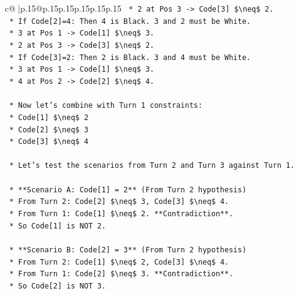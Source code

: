 \documentclass{article}
\begin{document}
{\begin{supertabular}{c@{$\;$}|p{.15\linewidth}@{}p{.15\linewidth}p{.15\linewidth}p{.15\linewidth}p{.15\linewidth}p{.15\linewidth}}
{{{\texttt{            *   2 at Pos 3 {-}> Code{[}3{]} \$\textbackslash{}neq\$ 2.} \\
\texttt{        *   If Code{[}2{]}=4: Then 4 is Black. 3 and 2 must be White.} \\
\texttt{            *   3 at Pos 1 {-}> Code{[}1{]} \$\textbackslash{}neq\$ 3.} \\
\texttt{            *   2 at Pos 3 {-}> Code{[}3{]} \$\textbackslash{}neq\$ 2.} \\
\texttt{        *   If Code{[}3{]}=2: Then 2 is Black. 3 and 4 must be White.} \\
\texttt{            *   3 at Pos 1 {-}> Code{[}1{]} \$\textbackslash{}neq\$ 3.} \\
\texttt{            *   4 at Pos 2 {-}> Code{[}2{]} \$\textbackslash{}neq\$ 4.} \\
\\ 
\texttt{    *   Now let's combine with Turn 1 constraints:} \\
\texttt{        *   Code{[}1{]} \$\textbackslash{}neq\$ 2} \\
\texttt{        *   Code{[}2{]} \$\textbackslash{}neq\$ 3} \\
\texttt{        *   Code{[}3{]} \$\textbackslash{}neq\$ 4} \\
\\ 
\texttt{    *   Let's test the scenarios from Turn 2 and Turn 3 against Turn 1.} \\
\\ 
\texttt{    *   **Scenario A: Code{[}1{]} = 2** (From Turn 2 hypothesis)} \\
\texttt{        *   From Turn 2: Code{[}2{]} \$\textbackslash{}neq\$ 3, Code{[}3{]} \$\textbackslash{}neq\$ 4.} \\
\texttt{        *   From Turn 1: Code{[}1{]} \$\textbackslash{}neq\$ 2. **Contradiction**.} \\
\texttt{        *   So Code{[}1{]} is NOT 2.} \\
\\ 
\texttt{    *   **Scenario B: Code{[}2{]} = 3** (From Turn 2 hypothesis)} \\
\texttt{        *   From Turn 2: Code{[}1{]} \$\textbackslash{}neq\$ 2, Code{[}3{]} \$\textbackslash{}neq\$ 4.} \\
\texttt{        *   From Turn 1: Code{[}2{]} \$\textbackslash{}neq\$ 3. **Contradiction**.} \\
\texttt{        *   So Code{[}2{]} is NOT 3.} \\
\\ 
}}}
\end{supertabular}}
\end{document}
